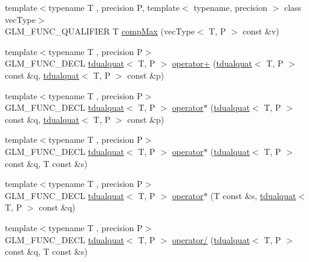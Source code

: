 \begin{DoxyCompactItemize}
\item 
{\footnotesize template$<$typename T , precision P, template$<$ typename, precision $>$ class vec\+Type$>$ }\\G\+L\+M\+\_\+\+F\+U\+N\+C\+\_\+\+Q\+U\+A\+L\+I\+F\+I\+E\+R T \hyperlink{namespaceglm_a6d3b715875f887b364a34a7529c8fc1b}{comp\+Max} (vec\+Type$<$ T, P $>$ const \&v)
\item 
{\footnotesize template$<$typename T , precision P$>$ }\\G\+L\+M\+\_\+\+F\+U\+N\+C\+\_\+\+D\+E\+C\+L \hyperlink{structglm_1_1tdualquat}{tdualquat}$<$ T, P $>$ \hyperlink{group__gtx__dual__quaternion_ga9d7cfca38c6ff90757705600da3c7972}{operator+} (\hyperlink{structglm_1_1tdualquat}{tdualquat}$<$ T, P $>$ const \&q, \hyperlink{structglm_1_1tdualquat}{tdualquat}$<$ T, P $>$ const \&p)
\item 
{\footnotesize template$<$typename T , precision P$>$ }\\G\+L\+M\+\_\+\+F\+U\+N\+C\+\_\+\+D\+E\+C\+L \hyperlink{structglm_1_1tdualquat}{tdualquat}$<$ T, P $>$ \hyperlink{group__gtx__dual__quaternion_ga2c224f87242fe82e8ebc17f01aa51126}{operator$\ast$} (\hyperlink{structglm_1_1tdualquat}{tdualquat}$<$ T, P $>$ const \&q, \hyperlink{structglm_1_1tdualquat}{tdualquat}$<$ T, P $>$ const \&p)
\item 
{\footnotesize template$<$typename T , precision P$>$ }\\G\+L\+M\+\_\+\+F\+U\+N\+C\+\_\+\+D\+E\+C\+L \hyperlink{structglm_1_1tdualquat}{tdualquat}$<$ T, P $>$ \hyperlink{group__gtx__dual__quaternion_ga5251d67271c42cf52227b6254f3fc8ed}{operator$\ast$} (\hyperlink{structglm_1_1tdualquat}{tdualquat}$<$ T, P $>$ const \&q, T const \&s)
\item 
{\footnotesize template$<$typename T , precision P$>$ }\\G\+L\+M\+\_\+\+F\+U\+N\+C\+\_\+\+D\+E\+C\+L \hyperlink{structglm_1_1tdualquat}{tdualquat}$<$ T, P $>$ \hyperlink{group__gtx__dual__quaternion_ga0aedf77f3e7d45464501570c28df0ed7}{operator$\ast$} (T const \&s, \hyperlink{structglm_1_1tdualquat}{tdualquat}$<$ T, P $>$ const \&q)
\item 
{\footnotesize template$<$typename T , precision P$>$ }\\G\+L\+M\+\_\+\+F\+U\+N\+C\+\_\+\+D\+E\+C\+L \hyperlink{structglm_1_1tdualquat}{tdualquat}$<$ T, P $>$ \hyperlink{group__gtx__dual__quaternion_gad27b1d064624dd6ff1ecc205616323ba}{operator/} (\hyperlink{structglm_1_1tdualquat}{tdualquat}$<$ T, P $>$ const \&q, T const \&s)
\item 

\end{DoxyCompactItemize}
